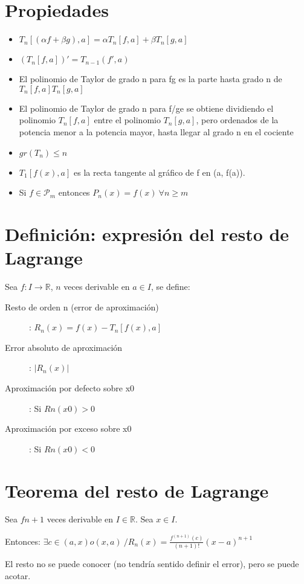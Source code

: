 \documentclass{report}
\begin{document}
	\section{Propiedades}
		\begin{itemize}
			\item $T_n[(\alpha f+ \beta g),a]= \alpha T_n[f,a] + \beta T_n[g,a]$
			\item $(T_n[f,a])'=T_{n-1}(f',a)$
			\item El polinomio de Taylor de grado n para fg es la parte hasta grado n de $T_n[f,a]T_n[g,a]$
			\item El polinomio de Taylor de grado n para f/ge se obtiene dividiendo el polinomio $T_n[f,a]$ entre el polinomio $T_n[g,a]$, pero ordenados de la potencia menor a la potencia mayor, hasta llegar al grado n en el cociente
			\item $gr(T_n)\leq n$
			\item $T_1[f(x),a]$ es la recta tangente al gráfico de f en (a, f(a)).
			\item Si $f\in \mathcal{P}_m$ entonces $P_n(x)=f(x) \ \forall n \geq m$
		\end{itemize}
	
	\section{Definición: expresión del resto de Lagrange}
		Sea $f:I\to\mathbb{R}$, $n$ veces derivable en $a \in I$, se define:
		
		\begin{description}
			\item[Resto de orden n (error de aproximación)]: $R_n(x)=f(x)-T_n[f(x),a]$
			\item[Error absoluto de aproximación]: $|R_n(x)|$
			\item[Aproximación por defecto sobre x0]: Si $Rn(x0)>0$
			\item[Aproximación por exceso sobre x0]: Si $Rn(x0)<0$ 
		\end{description}
	
	\section{Teorema del resto de Lagrange}
		Sea $f n+1$ veces derivable en $I \in \mathbb{R}$. Sea $x \in I$.
		
		Entonces: $\exists c \in (a,x) o (x,a) \ / R_n(x)=\frac{f^{(n+1)}(c)}{(n+1)!} (x-a)^{n+1}$
		
		El resto no se puede conocer (no tendría sentido definir el error), pero se puede acotar.
		
\end{document}

